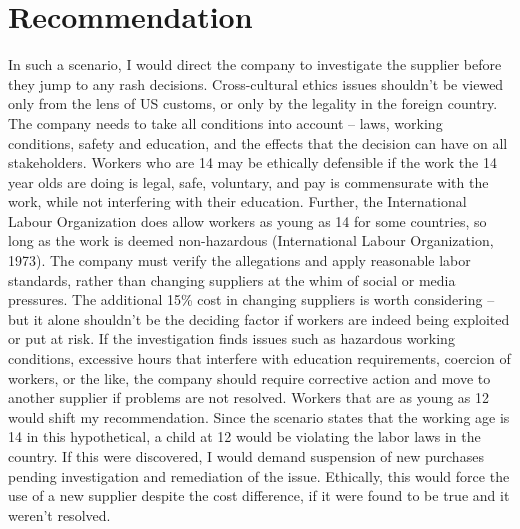 \section*{Recommendation}
In such a scenario, I would direct the company to investigate the supplier before they jump to any rash decisions. Cross-cultural ethics issues shouldn’t be viewed only from the lens of US customs, or only by the legality in the foreign country. The company needs to take all conditions into account – laws, working conditions, safety and education, and the effects that the decision can have on all stakeholders.
Workers who are 14 may be ethically defensible if the work the 14 year olds are doing is legal, safe, voluntary, and pay is commensurate with the work, while not interfering with their education. Further, the International Labour Organization does allow workers as young as 14 for some countries, so long as the work is deemed non-hazardous (International Labour Organization, 1973). The company must verify the allegations and apply reasonable labor standards, rather than changing suppliers at the whim of social or media pressures.
The additional 15\% cost in changing suppliers is worth considering – but it alone shouldn’t be the deciding factor if workers are indeed being exploited or put at risk. If the investigation finds issues such as hazardous working conditions, excessive hours that interfere with education requirements, coercion of workers, or the like, the company should require corrective action and move to another supplier if problems are not resolved.
Workers that are as young as 12 would shift my recommendation. Since the scenario states that the working age is 14 in this hypothetical, a child at 12 would be violating the labor laws in the country. If this were discovered, I would demand suspension of new purchases pending investigation and remediation of the issue. Ethically, this would force the use of a new supplier despite the cost difference, if it were found to be true and it weren’t resolved.

